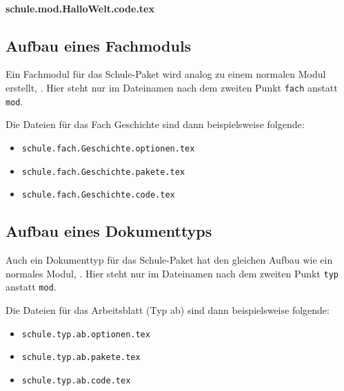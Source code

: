 	\paragraph{schule.mod.HalloWelt.code.tex}
\begin{sourcecode}[gobble=0]

\newcommand{\halloWelt}{
  \ifthenelse{\boolean{schule@nutzeGoodbye}}{
    Goodbye \schule@weltname!
  }{
    Hallo \schule@weltname!
  }
}
\end{sourcecode}


    \subsection{Aufbau eines Fachmoduls}

    \label{sec:devmoduleFachmodul}

    Ein Fachmodul für das Schule-Paket wird analog zu einem normalen Modul erstellt, \vgl\space{}. Hier steht nur im Dateinamen nach dem zweiten Punkt \texttt{fach} anstatt \texttt{mod}.

    Die Dateien für das Fach Geschichte sind dann beispielsweise folgende:
    \begin{itemize}
        \item \texttt{schule.fach.Geschichte.optionen.tex}
        \item \texttt{schule.fach.Geschichte.pakete.tex}
        \item \texttt{schule.fach.Geschichte.code.tex}
    \end{itemize}


    \subsection{Aufbau eines Dokumenttyps}

    \label{sec:devDokumenttyp}

    Auch ein Dokumenttyp für das Schule-Paket hat den gleichen Aufbau wie ein normales Modul, \vgl\space{}. Hier steht nur im Dateinamen nach dem zweiten Punkt \texttt{typ} anstatt \texttt{mod}.

    Die Dateien für das Arbeitsblatt (Typ ab) sind dann beispielsweise folgende:
    \begin{itemize}
        \item \texttt{schule.typ.ab.optionen.tex}
        \item \texttt{schule.typ.ab.pakete.tex}
        \item \texttt{schule.typ.ab.code.tex}
    \end{itemize}
